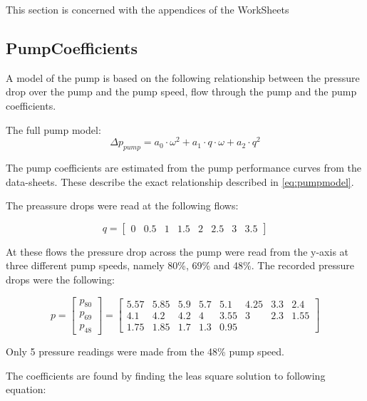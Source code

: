 This section is concerned with the appendices of the WorkSheets

\subsection{PumpCoefficients} \label{ap:PumpCoef}

A model of the pump is based on the following relationship between the pressure drop over the pump and the pump speed, flow through the pump and the pump coefficients.

The full pump model:
\begin{equation} \label{eq:pumpmodel}
		\Delta p_{pump}  = a_0  \cdot \omega^2 + a_1 \cdot q \cdot \omega + a_2 \cdot q^2
\end{equation}

The pump coefficients are estimated from the pump performance curves from the data-sheets. These describe the exact relationship described in \cref{eq:pumpmodel}.

The preassure drops were read at the following flows:

\begin{equation}
	q = \begin{bmatrix}
		0 & 0.5 & 1 & 1.5 & 2 & 2.5 & 3 & 3.5 
	\end{bmatrix} 
\label{eq:pump_q}
\end{equation}

At these flows the pressure drop across the pump were read from the y-axis at three different pump speeds, namely 80\%, 69\% and 48\%. The recorded pressure drops were the following:

\begin{equation}
	p =  \begin{bmatrix}
		p_{80}\\
		p_{69} \\
		p_{48}
	\end{bmatrix}  = 
	\begin{bmatrix}
		5.57 & 5.85 & 5.9 & 5.7 & 5.1 & 4.25 & 3.3 & 2.4 \\
		4.1 & 4.2 & 4.2 & 4 & 3.55 & 3 & 2.3 & 1.55 \\
		1.75 & 1.85 & 1.7 & 1.3 & 0.95 &  &  &  
	\end{bmatrix} 
\label{eq:pump_p}
\end{equation}

Only 5 pressure readings were made from the 48\% pump speed.

The coefficients are found by finding the leas square solution to following equation:

